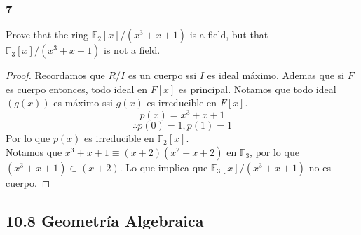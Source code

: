 \documentclass[11pt]{article}
\newcommand{\set}[1]{\mathbb{#1}}
\theoremstyle{definition}
\begin{document}
        \subsubsection{7}
        Prove that the ring $\set{F}_2[x]/(x^3+x+1)$ is a field, but that $\set{F}_3[x]/(x^3+x+1)$ is not a field.
        \begin{proof}
            Recordamos que $R/I$ es un cuerpo ssi $I$ es ideal máximo. Ademas que si $F$ es cuerpo entonces, todo ideal en $F[x]$ es principal. Notamos que todo ideal $(g(x))$ es máximo ssi $g(x)$ es irreducible en $F[x]$.
            \[p(x)=x^3+x+1\]
            \[\therefore p(0)=1,p(1)=1\]
            Por lo que $p(x)$ es irreducible en $\set{F}_2[x]$.\\
            Notamos que $x^3+x+1\equiv (x+2)(x^2+x+2)$ en $\set{F}_3$, por lo que $(x^3+x+1)\subset(x+2)$. Lo que implica que $\set{F}_3[x]/(x^3+x+1)$ no es cuerpo.
        \end{proof}

        \subsection{10.8 Geometría Algebraica}
\end{document}
